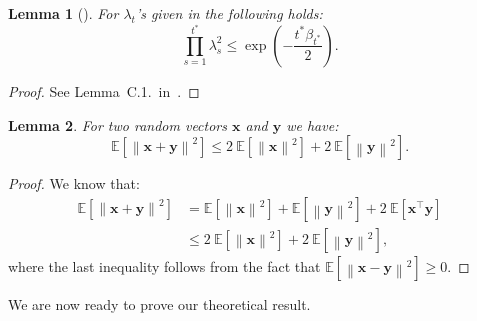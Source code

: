\documentclass[conference]{IEEEtran}
\newtheorem{lemma}{Lemma}
\theoremstyle{definition}
\theoremstyle{remark}
\theoremstyle{proposition}
\newcommand{\norm}[1]{\left\lVert#1\right\rVert}
\begin{document}
\begin{lemma}[\citep{chung2022come}]\label{lem:exp}
    For $\lambda_t$'s given in  the following holds:
    \begin{equation}\label{eq:exp}
        \prod_{s=1}^{t^{*}} \lambda_{s}^{2} \leq \exp({-\frac{t^{*}\beta_{t^{*}}}{2}}).
    \end{equation}
\end{lemma}
\begin{proof}
    See Lemma~C.1.~in~\citep{chung2022come}.
\end{proof}
\begin{lemma}\label{lem:mean}
    For two random vectors $\mathbf{x}$ and $\mathbf{y}$ we have:
    \begin{equation}\label{eq:mean}
        \mathbb{E}\left[\norm{\mathbf{x} + \mathbf{y}}^2\right] \leq 2~\mathbb{E}\left[\norm{\mathbf{x}}^2\right] + 2~\mathbb{E}\left[\norm{\mathbf{y}}^2\right].
    \end{equation}
\end{lemma}
\begin{proof}
    We know that:
    \begin{align}\nonumber
        \mathbb{E}\left[\norm{\mathbf{x} + \mathbf{y}}^2\right] &= \mathbb{E}\left[\norm{\mathbf{x}}^2\right] + \mathbb{E}\left[\norm{\mathbf{y}}^2\right] + 2~\mathbb{E}\left[\mathbf{x}^\top\mathbf{y}\right]\\\nonumber
        & \leq 2~\mathbb{E}\left[\norm{\mathbf{x}}^2\right] + 2~\mathbb{E}\left[\norm{\mathbf{y}}^2\right],
    \end{align}
    where the last inequality follows from the fact that $\mathbb{E}\left[\norm{\mathbf{x} - \mathbf{y}}^2\right] \geq 0$.
\end{proof}

We are now ready to prove our theoretical result.
\end{document}
